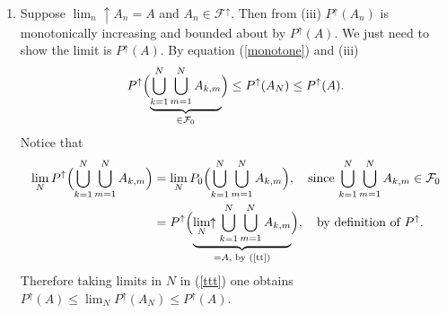 \documentclass[10pt,letterpaper]{article}
\begin{document}
\begin{enumerate}
\item  Suppose $\lim_n\!\!\uparrow A_n= A$ and $A_n\in \mathcal F^\uparrow$. Then from (iii)  $P^\uparrow(A_n)$ is monotonically increasing and bounded about by $P^\uparrow(A)$. We just need to show the limit is $P^\uparrow(A)$. By equation (\ref{monotone}) and (iii)
\begin{equation}
\label{ttt}
 P^\uparrow\Bigl(\underbrace{\bigcup_{k=1}^N \bigcup_{m=1}^N A_{k,m}}_{\in \mathcal F_0}\Bigr)\leq P^\uparrow(A_N)\leq  P^\uparrow(A). \end{equation}
Notice that
\begin{align*}
 \lim_N P^\uparrow\Bigl(\bigcup_{k=1}^N \bigcup_{m=1}^N A_{k,m}\Bigr) &= \lim_N P_0\Bigl(\bigcup_{k=1}^N \bigcup_{m=1}^N A_{k,m}\Bigr),\quad \text{since $\bigcup_{k=1}^N \bigcup_{m=1}^N A_{k,m}\in \mathcal F_0$} \\
 &= P^\uparrow\Bigl( \underbrace{\lim_N\!\!\uparrow \bigcup_{k=1}^N \bigcup_{m=1}^N A_{k,m}}_{=A,\text{ by (\ref{tt})}}\Bigr),\quad \text{by definition of $P^\uparrow$.}
 \end{align*}
 Therefore taking limits in $N$ in (\ref{ttt}) one obtains $ P^\uparrow(A)\leq \lim_N P^\uparrow(A_N)  \leq P^\uparrow(A)$.
\end{enumerate}



\end{document}
